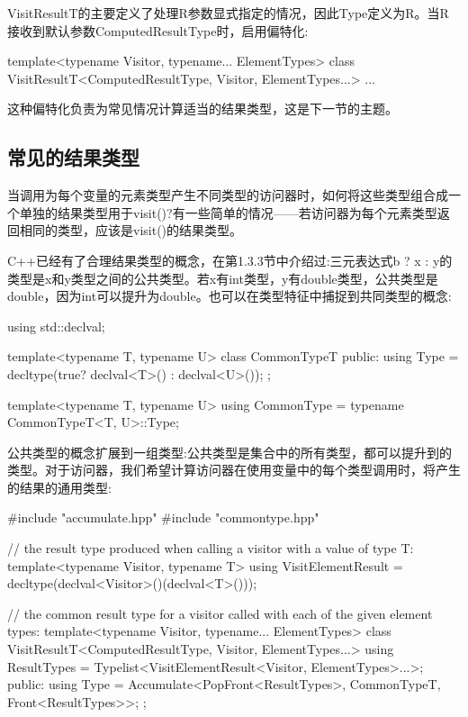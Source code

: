 VisitResultT的主要定义了处理R参数显式指定的情况，因此Type定义为R。当R接收到默认参数ComputedResultType时，启用偏特化:

\begin{cpp}
template<typename Visitor, typename... ElementTypes>
class VisitResultT<ComputedResultType, Visitor, ElementTypes...>
{
	...
}
\end{cpp}

这种偏特化负责为常见情况计算适当的结果类型，这是下一节的主题。

\subsection{常见的结果类型}

当调用为每个变量的元素类型产生不同类型的访问器时，如何将这些类型组合成一个单独的结果类型用于visit()?有一些简单的情况——若访问器为每个元素类型返回相同的类型，应该是visit()的结果类型。

C++已经有了合理结果类型的概念，在第1.3.3节中介绍过:三元表达式b ? x : y的类型是x和y类型之间的公共类型。若x有int类型，y有double类型，公共类型是double，因为int可以提升为double。也可以在类型特征中捕捉到共同类型的概念:

\begin{cpp}
using std::declval;

template<typename T, typename U>
class CommonTypeT
{
	public:
	using Type = decltype(true? declval<T>() : declval<U>());
};

template<typename T, typename U>
using CommonType = typename CommonTypeT<T, U>::Type;
\end{cpp}

公共类型的概念扩展到一组类型:公共类型是集合中的所有类型，都可以提升到的类型。对于访问器，我们希望计算访问器在使用变量中的每个类型调用时，将产生的结果的通用类型:

\begin{cpp}
#include "accumulate.hpp"
#include "commontype.hpp"

// the result type produced when calling a visitor with a value of type T:
template<typename Visitor, typename T>
using VisitElementResult = decltype(declval<Visitor>()(declval<T>()));

// the common result type for a visitor called with each of the given element types:
template<typename Visitor, typename... ElementTypes>
class VisitResultT<ComputedResultType, Visitor, ElementTypes...>
{
	using ResultTypes =
		Typelist<VisitElementResult<Visitor, ElementTypes>...>;
	public:
	using Type =
		Accumulate<PopFront<ResultTypes>, CommonTypeT, Front<ResultTypes>>;
};
\end{cpp}

